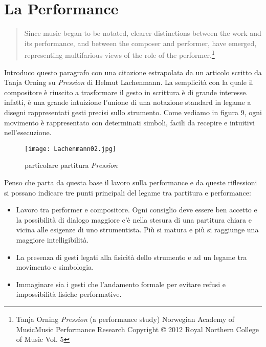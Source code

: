
\chapter{La Performance}
\label{chp:La Performance}

\begin{quotation}
Since music began to be notated, clearer distinctions between the work and its performance, and between the composer and performer, have emerged, representing multifarious views of the role of the performer.\footnote{Tanja Orning \textit{Pression} (a performance study) Norwegian Academy of MusicMusic Performance Research Copyright © 2012 Royal Northern College of Music Vol. 5}
\end{quotation}

Introduco questo paragrafo con una citazione estrapolata da un articolo scritto da Tanja Orning su \textit{Pression} di Helmut Lachenmann. La semplicità con la quale il compositore è riuscito a trasformare il gesto in scrittura è di grande interesse. infatti, è una grande intuizione l'unione di una notazione standard in legame a disegni rappresentati gesti precisi sullo strumento. Come vediamo in figura 9, ogni movimento è rappresentato con determinati simboli, facili da recepire e intuitivi nell'esecuzione. 

\begin{figure}[!h]
\centering
\texttt{[image: Lachenmann02.jpg]}
\caption{particolare partitura \textit{Pression}}
\end{figure}

Penso che parta da questa base il lavoro sulla performance e da queste riflessioni si possano indicare tre punti principali del legame tra partitura e performance:

\begin{itemize}
\item{Lavoro tra performer e compositore. Ogni consiglio deve essere ben accetto e la possibilità di dialogo maggiore c'è nella stesura di una partitura chiara e vicina alle esigenze di uno strumentista. Più si matura e più si 
raggiunge una maggiore intelligibilità.}
\item{La presenza di gesti legati alla fisicità dello strumento e ad un legame tra movimento e simbologia.}
\item{Immaginare sia i gesti che l'andamento formale per evitare refusi e impossibilità fisiche performative.}
\end{itemize}

